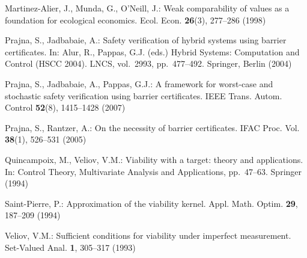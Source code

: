 \documentclass[11pt]{article}
\begin{document}
Martinez-Alier, J., Munda, G., O'Neill, J.: Weak comparability of values
as a foundation for ecological economics. Ecol. Econ. \textbf{26}(3),
277--286 (1998)

Prajna, S., Jadbabaie, A.: Safety verification of hybrid systems using
barrier certificates. In: Alur, R., Pappas, G.J. (eds.) Hybrid Systems:
Computation and Control (HSCC 2004). LNCS, vol.~2993, pp.~477--492.
Springer, Berlin (2004)

Prajna, S., Jadbabaie, A., Pappas, G.J.: A framework for worst-case and
stochastic safety verification using barrier certificates. IEEE Trans.
Autom. Control \textbf{52}(8), 1415--1428 (2007)

Prajna, S., Rantzer, A.: On the necessity of barrier certificates. IFAC
Proc. Vol. \textbf{38}(1), 526--531 (2005)

Quincampoix, M., Veliov, V.M.: Viability with a target: theory and
applications. In: Control Theory, Multivariate Analysis and
Applications, pp.~47--63. Springer (1994)

Saint-Pierre, P.: Approximation of the viability kernel. Appl. Math.
Optim. \textbf{29}, 187--209 (1994)

Veliov, V.M.: Sufficient conditions for viability under imperfect
measurement. Set-Valued Anal. \textbf{1}, 305--317 (1993)
\end{document}
